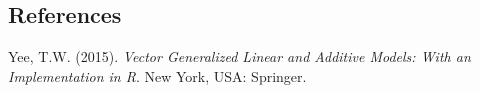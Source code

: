 \documentclass[12pt]{article}
\begin{document}
%
%
%

\subsection*{References}

\begin{description}

\item
Yee, T.W. (2015).
\textit{Vector Generalized Linear and Additive Models: With
an Implementation in R}.
New York, USA: Springer.


\end{description}
\end{document}

